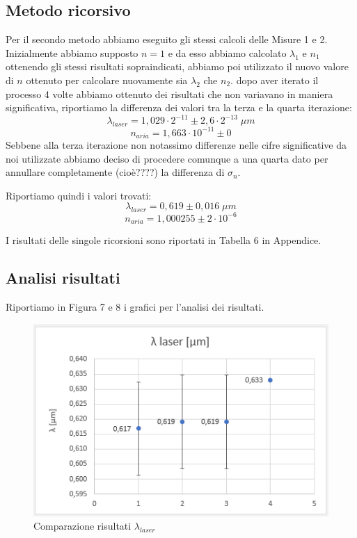 \documentclass{article}
\begin{document}
\subsection{Metodo ricorsivo}
Per il secondo metodo abbiamo eseguito gli stessi calcoli delle Misure 1 e 2. Inizialmente abbiamo supposto $n = 1$ e da esso abbiamo calcolato $\lambda_1$ e $n_1$ ottenendo gli stessi risultati sopraindicati, abbiamo poi utilizzato il nuovo valore di $n$ ottenuto per calcolare nuovamente sia $\lambda_2$ che $n_2$. dopo aver iterato il processo 4 volte abbiamo ottenuto dei risultati che non variavano in maniera significativa, riportiamo la differenza dei valori tra la terza e la quarta iterazione:
\[ \lambda_{laser} = 1,029 \cdot 2^{-11} \pm 2,6 \cdot 2^{-13} \; \mu m \]
\[ n_{aria} = 1,663 \cdot 10^{-11} \pm 0 \]
Sebbene alla terza iterazione non notassimo differenze nelle cifre significative da noi utilizzate abbiamo deciso di procedere comunque a una quarta dato per annullare completamente (cioè????) la differenza di $\sigma_n$. 

\vspace{3mm}

Riportiamo quindi i valori trovati:
\[ \lambda_{laser} = 0,619 \pm 0,016 \; \mu m \]
\[ n_{aria} = 1,000255 \pm 2 \cdot 10^{-6} \]

I risultati delle singole ricorsioni sono riportati in Tabella 6 in Appendice.



\subsection{Analisi risultati}
Riportiamo in Figura 7 e 8 i grafici per l'analisi dei risultati.

\begin{figure}[h!]
  \centering
  \includegraphics[width=0.6\linewidth]{IM grafico risultati lambda}
  \caption{Comparazione risultati $\lambda_{laser}$}
\end{figure}
\end{document}
